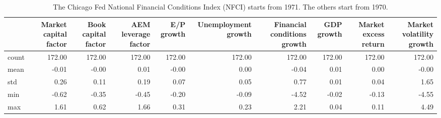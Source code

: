 \begin{table}
\caption{The Chicago Fed National Financial Conditions Index (NFCI) starts from 1971. The others start from 1970.}
\label{tab:Table 2.1}
\begin{tabular}{lrrrrrrrrr}
\toprule
 & Market capital factor & Book capital factor & AEM leverage factor & E/P growth & Unemployment growth & Financial conditions growth & GDP growth & Market excess return & Market volatility growth \\
\midrule
count & 172.00 & 172.00 & 172.00 & 172.00 & 172.00 & 172.00 & 172.00 & 172.00 & 172.00 \\
mean & -0.01 & -0.00 & 0.01 & -0.00 & 0.00 & -0.04 & 0.01 & 0.00 & -0.00 \\
std & 0.26 & 0.11 & 0.19 & 0.07 & 0.05 & 0.77 & 0.01 & 0.04 & 1.65 \\
min & -0.62 & -0.35 & -0.45 & -0.20 & -0.09 & -4.52 & -0.02 & -0.13 & -4.55 \\
max & 1.61 & 0.62 & 1.66 & 0.31 & 0.23 & 2.21 & 0.04 & 0.11 & 4.49 \\
\bottomrule
\end{tabular}
\end{table}
